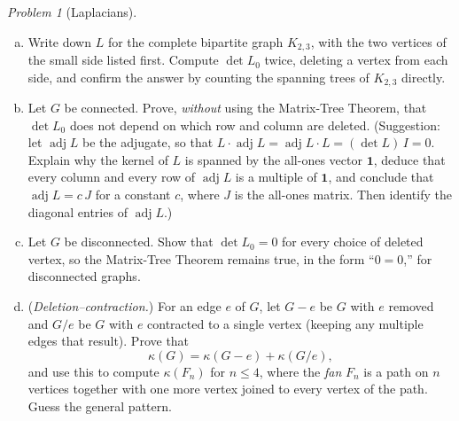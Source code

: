 \documentclass[11pt,twoside]{amsart}
\theoremstyle{plain}
\theoremstyle{remark}
\newtheorem{prob}{Problem}
\theoremstyle{definition}
\newcommand{\kap}{\kappa}
\newcommand{\adj}{\operatorname{adj}}
\begin{document}
\begin{prob}[Laplacians]
\begin{enumerate}[(a)]
\item Write down $L$ for the complete bipartite graph $K_{2,3}$, with the two vertices of the
small side listed first. Compute $\det L_0$ twice, deleting a vertex from each side, and confirm
the answer by counting the spanning trees of $K_{2,3}$ directly.
\item Let $G$ be connected. Prove, \emph{without} using the Matrix-Tree Theorem, that
$\det L_0$ does not depend on which row and column are deleted. (Suggestion: let $\adj L$ be
the adjugate, so that $L\cdot\adj L=\adj L\cdot L=(\det L)\,I=0$. Explain why the kernel of $L$
is spanned by the all-ones vector $\mathbf 1$, deduce that every column and every row of
$\adj L$ is a multiple of $\mathbf 1$, and conclude that $\adj L=c\,J$ for a constant $c$,
where $J$ is the all-ones matrix. Then identify the diagonal entries of $\adj L$.)
\item Let $G$ be disconnected. Show that $\det L_0=0$ for every choice of deleted vertex, so
the Matrix-Tree Theorem remains true, in the form ``$0=0$,'' for disconnected graphs.
\item (\emph{Deletion--contraction.}) For an edge $e$ of $G$, let $G-e$ be $G$ with $e$
removed and $G/e$ be $G$ with $e$ contracted to a single vertex (keeping any multiple edges
that result). Prove that
\[
\kap(G)=\kap(G-e)+\kap(G/e),
\]
and use this to compute $\kap(F_n)$ for $n\le 4$, where the \emph{fan} $F_n$ is a path on
$n$ vertices together with one more vertex joined to every vertex of the path. Guess the
general pattern.
\end{enumerate}
\end{prob}
\end{document}
